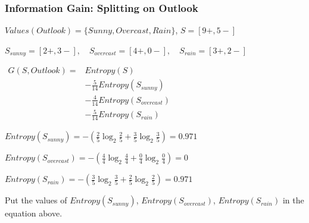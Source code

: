\begin{frame}[fragile]\frametitle{Information Gain: Splitting on Outlook}
$Values(Outlook) = \{Sunny, Overcast, Rain\}$, \quad $S = [9+,5-]$
\begin{center}
\footnotesize
$\displaystyle S_{sunny} = [2+,3-], \quad S_{overcast} = [4+,0-], \quad S_{rain} = [3+,2-]$
\end{center}
\begin{center}
\footnotesize
$\displaystyle \begin{aligned}
G(S,Outlook) = {}& Entropy(S) \\
& - \frac{5}{14}Entropy(S_{sunny}) \\
& - \frac{4}{14}Entropy(S_{overcast}) \\
& - \frac{5}{14}Entropy(S_{rain})
\end{aligned}$
\end{center}
\begin{center}
\footnotesize
$\displaystyle Entropy(S_{sunny}) = -\left(\frac{2}{5}\log_2\frac{2}{5} + \frac{3}{5}\log_2\frac{3}{5}\right) = 0.971$
\end{center}
\begin{center}
\footnotesize
$\displaystyle Entropy(S_{overcast}) = -\left(\frac{4}{4}\log_2\frac{4}{4} + \frac{0}{4}\log_2\frac{0}{4}\right) = 0$
\end{center}
\begin{center}
\footnotesize
$\displaystyle Entropy(S_{rain}) = -\left(\frac{3}{5}\log_2\frac{3}{5} + \frac{2}{5}\log_2\frac{2}{5}\right) = 0.971$
\end{center}
Put the values of $Entropy(S_{sunny})$, $Entropy(S_{overcast})$, $Entropy(S_{rain})$ in the equation above.
\end{frame}





